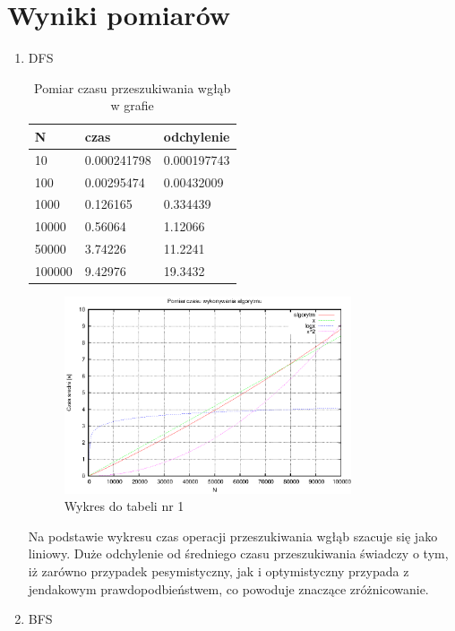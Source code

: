 \documentclass[a4paper,11pt]{article}
\begin{document}
\section{Wyniki pomiarów}
\begin{enumerate}
 \item DFS
   
  \begin{table}[th]
  \centering
    \caption{Pomiar czasu przeszukiwania wgłąb w grafie}

      \begin{tabular}{|l|l|l|}
	\hline
	N & czas & odchylenie \\
    \hline
  10 & 0.000241798 & 0.000197743 \\
  \hline
100 & 0.00295474 & 0.00432009 \\
\hline
1000 & 0.126165 & 0.334439 \\
\hline
10000 & 0.56064 & 1.12066 \\
\hline
50000 & 3.74226 & 11.2241 \\
\hline
100000 & 9.42976 & 19.3432 \\
\hline
    \end{tabular}
    \end{table}
    \newpage
 \begin{figure}[th]
\centering
\includegraphics[width=0.8\textwidth]{../prj/wykres13.eps}
\caption{Wykres do tabeli nr 1}
\label{Wykres do tabeli nr 1}
\end{figure} 
Na podstawie wykresu czas operacji przeszukiwania wgłąb szacuje się jako liniowy. Duże odchylenie od średniego czasu przeszukiwania świadczy o tym,
 iż zarówno przypadek pesymistyczny, jak i optymistyczny przypada z jendakowym prawdopodbieństwem, co powoduje znaczące zróżnicowanie.
\item BFS
  \begin{table}[th]
  \centering
  

\end{table}
\end{enumerate}
\end{document}
